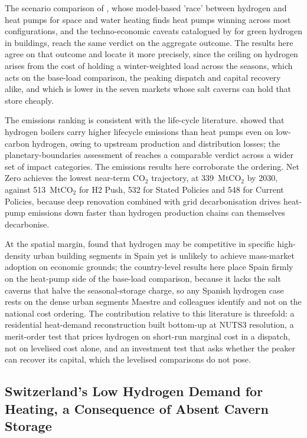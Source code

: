 The scenario
comparison of \citet{Billerbeck2023Race}, whose model-based 'race' between
hydrogen and heat pumps for space and water heating finds heat pumps winning
across most configurations, and the techno-economic caveats catalogued by
\citet{Badakhsh2023Caveats} for green hydrogen in buildings, reach the same
verdict on the aggregate outcome. The results here agree on that outcome and
locate it more precisely, since the ceiling on hydrogen arises from the cost of
holding a winter-weighted load across the seasons, which acts on the base-load
comparison, the peaking dispatch and capital recovery alike, and which is lower in
the seven markets whose salt caverns can hold that store cheaply.

The emissions ranking is consistent with the life-cycle literature.
\citet{Slorach2021Net} showed that hydrogen boilers carry higher lifecycle emissions
than heat pumps even on low-carbon hydrogen, owing to upstream production and
distribution losses; the planetary-boundaries assessment of \citet{Weidner2023Planetary}
reaches a comparable verdict across a wider set of impact categories. The emissions
results here corroborate the ordering. Net Zero achieves the lowest near-term CO$_2$
trajectory, at 339~MtCO$_2$ by 2030, against 513~MtCO$_2$ for H2 Push, 532 for Stated
Policies and 548 for Current Policies, because deep renovation combined with grid
decarbonisation drives heat-pump emissions down faster than hydrogen production chains
can themselves decarbonise.

At the spatial margin, \citet{Maestre2022} found that hydrogen may be competitive in
specific high-density urban building segments in Spain yet is unlikely to achieve
mass-market adoption on economic grounds; the country-level results here place Spain
firmly on the heat-pump side of the base-load comparison, because it lacks the salt
caverns that halve the seasonal-storage charge, so any Spanish hydrogen case rests on
the dense urban segments Maestre and colleagues identify and not on the national cost
ordering. The contribution relative to this literature is threefold: a residential
heat-demand reconstruction built bottom-up at NUTS3 resolution, a merit-order test that
prices hydrogen on short-run marginal cost in a dispatch, not on levelised cost alone,
and an investment test that asks whether the peaker can recover its capital, which the
levelised comparisons do not pose.

\subsection{Switzerland's Low Hydrogen Demand for Heating, a Consequence of Absent Cavern Storage}


